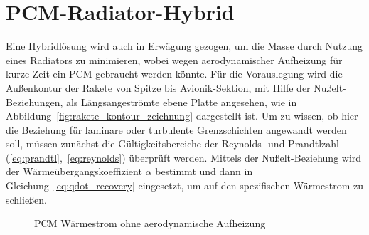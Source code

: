 \section{PCM-Radiator-Hybrid}\label{sec:pcm_radiator_hybrid}

Eine Hybridlösung wird auch in Erwägung gezogen, um die Masse durch Nutzung eines Radiators zu minimieren, wobei wegen aerodynamischer Aufheizung für kurze Zeit ein PCM gebraucht werden könnte.
Für die Vorauslegung wird die Außenkontur der Rakete von Spitze bis Avionik-Sektion, mit Hilfe der Nußelt-Beziehungen, als Längsangeströmte ebene Platte angesehen,
wie in Abbildung~\ref{fig:rakete_kontour_zeichnung} dargestellt ist.
Um zu wissen, ob hier die Beziehung für laminare oder turbulente Grenzschichten angewandt werden soll, müssen zunächst die Gültigkeitsbereiche der Reynolds- und Prandtlzahl (\ref{eq:prandtl},~\ref{eq:reynolds}) überprüft werden.
Mittels der Nußelt-Beziehung wird der Wärmeübergangskoeffizient $\alpha$ bestimmt und dann in Gleichung~\ref{eq:qdot_recovery} eingesetzt, um auf den spezifischen Wärmestrom zu schließen.

\begin{figure}
  \centering
  \caption{PCM Wärmestrom ohne aerodynamische Aufheizung}\label{fig:pcm_waermestrom_diagramm}
\end{figure}

